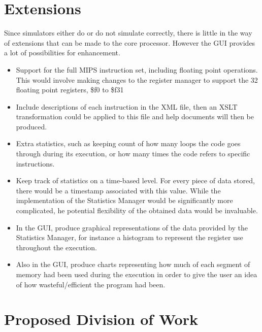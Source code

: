 \documentclass[12pt]{report}
\begin{document}
\chapter{Extensions}

Since simulators either do or do  not simulate correctly, there is little in the way of extensions that can be made to the core processor.  However the GUI provides a lot of possibilities for enhancement.

\begin{itemize}

\item Support for the full MIPS instruction set, including floating point operations. This would involve making changes to the register manager to support the 32 floating point registers, \$f0 to \$f31

\item Include descriptions of each instruction in the XML file, then an XSLT transformation could be applied to this file and help documents will then be produced.

\item Extra statistics, such as keeping count of how many loops the code goes through during its execution, or how many times the code refers to specific instructions.

\item Keep track of statistics on a time-based level. For every piece of data stored, there would be a timestamp associated with this value. While the implementation of the Statistics Manager would be significantly more complicated, he potential flexibility of the obtained data would be invaluable.

\item In the GUI, produce graphical representations of the data provided by the Statistics Manager, for instance a histogram to represent the register use throughout the execution.

\item Also in the GUI, produce charts representing how much of each segment of memory had been used during the execution in order to give the user an idea of how wasteful/efficient the program had been.

\end{itemize}


\chapter{Proposed Division of Work}
\end{document}
